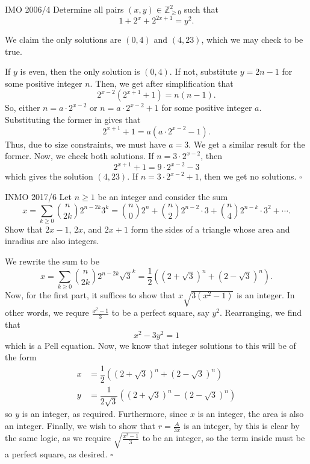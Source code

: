 \documentclass{article}
\begin{document}
\begin{problem}[4.9.4]{IMO 2006/4}
Determine all pairs $(x, y) \in \mathbb{Z}_{\ge 0}^2$ such that \[1 + 2^x + 2^{2x+1} = y^2.\]
\end{problem}

We claim the only solutions are $\boxed{(0, 4)}$ and $\boxed{(4, 23)}$, which we may check to be true.

If $y$ is even, then the only solution is $(0, 4)$. If not, substitute $y = 2n-1$ for some positive integer $n$. Then, we get after simplification that \[2^{x-2}(2^{x+1}+1) = n(n-1).\] So, either $n = a\cdot2^{x-2}$ or $n = a\cdot2^{x-2}+1$ for some positive integer $a$. Substituting the former in gives that \[2^{x+1}+1 = a(a\cdot2^{x-2}-1).\] Thus, due to size constraints, we must have $a = 3$. We get a similar result for the former. Now, we check both solutions. If $n = 3\cdot 2^{x-2}$, then \[2^{x+1}+1=9\cdot 2^{x-2}-3\] which gives the solution $(4, 23)$. If $n = 3\cdot 2^{x-2}+1$, then we get no solutions. $\square$

\begin{problem}[4.9.5]{INMO 2017/6}
Let $n \ge 1$ be an integer and consider the sum \[x = \sum_{k \ge 0} \binom{n}{2k}2^{n-2k}3^k = \binom{n}{0}2^n+\binom{n}{2}2^{n-2}\cdot 3 + \binom{n}{4}2^{n-k}\cdot 3^2 + \cdots.\] Show that $2x-1$, $2x$, and $2x+1$ form the sides of a triangle whose area and inradius are also integers.
\end{problem}

We rewrite the sum to be \[x = \sum_{k \ge 0} \binom{n}{2k}2^{n-2k}\sqrt{3}^k = \dfrac{1}{2}\left((2+\sqrt{3})^n+(2-\sqrt{3})^n\right).\] Now, for the first part, it suffices to show that $x\sqrt{3(x^2-1)}$ is an integer. In other words, we requre $\tfrac{x^2-1}{3}$ to be a perfect square, say $y^2$. Rearranging, we find that \[x^2-3y^2 = 1\] which is a Pell equation. Now, we know that integer solutions to this will be of the form
\begin{align*}
x &= \dfrac{1}{2}\left((2+\sqrt{3})^n+(2-\sqrt{3})^n\right) \\
y &= \dfrac{1}{2\sqrt{3}}\left((2+\sqrt{3})^n-(2-\sqrt{3})^n\right)
\end{align*}
so $y$ is an integer, as required. Furthermore, since $x$ is an integer, the area is also an integer. Finally, we wish to show that $r = \tfrac{A}{3x}$ is an integer, by this is clear by the same logic, as we require $\sqrt{\tfrac{x^2-1}{3}}$ to be an integer, so the term inside must be a perfect square, as desired. $\square$
\end{document}
